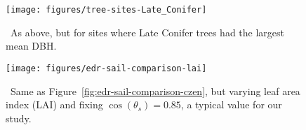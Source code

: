 \clearpage

\begin{figure}[ht]
  \centering
  \texttt{[image: figures/tree-sites-Late\_Conifer]}
  \caption{\label{fig:tree-sites-LC}\
    As above, but for sites where Late Conifer trees had the largest mean DBH.\@
  }
\end{figure}

\clearpage

\begin{figure}[ht]
  \centering
  \texttt{[image: figures/edr-sail-comparison-lai]}
  \caption{\label{fig:edr-sail-comparison-lai}\
    Same as Figure~\ref{fig:edr-sail-comparison-czen}, but varying leaf area index (LAI) and fixing $\cos(\theta_{s}) = 0.85$, a typical value for our study.
  }
\end{figure}

